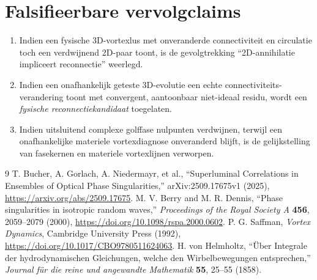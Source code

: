\documentclass[11pt,a4paper]{article}
\begin{document}
\section{Falsifieerbare vervolgclaims}
\begin{enumerate}
\item Indien een fysische 3D-vortexlus met onveranderde connectiviteit en
      circulatie toch een verdwijnend 2D-paar toont, is de gevolgtrekking
      ``2D-annihilatie impliceert reconnectie'' weerlegd.
\item Indien een onafhankelijk geteste 3D-evolutie een echte connectiviteits-
      verandering toont met convergent, aantoonbaar niet-ideaal residu,
      wordt een \emph{fysische reconnectiekandidaat} toegelaten.
\item Indien uitsluitend complexe golffase nulpunten verdwijnen, terwijl een
      onafhankelijke materiele vortexdiagnose onveranderd blijft, is de
      gelijkstelling van fasekernen en materiele vortexlijnen verworpen.
\end{enumerate}

\begin{thebibliography}{9}
T. Bucher, A. Gorlach, A. Niedermayr, et al.,
``Superluminal Correlations in Ensembles of Optical Phase Singularities,''
arXiv:2509.17675v1 (2025), \url{https://arxiv.org/abs/2509.17675}.
M. V. Berry and M. R. Dennis,
``Phase singularities in isotropic random waves,''
\emph{Proceedings of the Royal Society A} \textbf{456}, 2059--2079 (2000),
\url{https://doi.org/10.1098/rspa.2000.0602}.
P. G. Saffman, \emph{Vortex Dynamics},
Cambridge University Press (1992),
\url{https://doi.org/10.1017/CBO9780511624063}.
H. von Helmholtz, ``\"Uber Integrale der hydrodynamischen Gleichungen,
welche den Wirbelbewegungen entsprechen,''
\emph{Journal f\"ur die reine und angewandte Mathematik} \textbf{55},
25--55 (1858).
\end{thebibliography}
\end{document}
